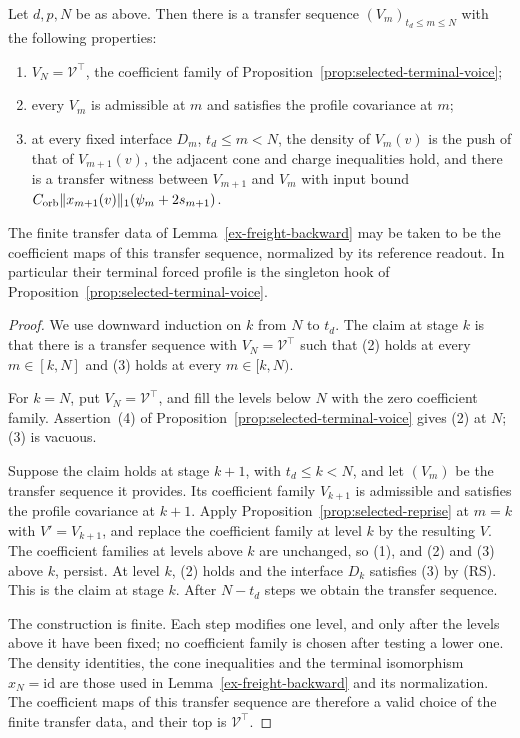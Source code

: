 \begin{proposition}
\label{prop:selected-music}
Let $d,p,N$ be as above. Then
there is a transfer sequence $(V_m)_{t_d\le m\le N}$ with the following properties:
\begin{enumerate}
\item $V_N=\mathcal V^\top$, the coefficient family of
  Proposition~\ref{prop:selected-terminal-voice};
\item every $V_m$ is admissible at $m$ and satisfies the profile covariance at
  $m$;
\item at every fixed interface $D_m$, $t_d\le m<N$, the density of $V_m(v)$
  is the push of that of $V_{m+1}(v)$, the adjacent cone and charge
  inequalities hold, and there is a transfer witness between $V_{m+1}$ and $V_m$
  with input bound $C_{\rm orb}\|x_{m+1}(v)\|_1(\psi_m+2s_{m+1})$.
\end{enumerate}
The finite transfer data of Lemma~\ref{ex-freight-backward} may be taken
to be the coefficient maps of this transfer sequence, normalized by its reference readout. In
particular their terminal forced profile is the singleton hook of
Proposition~\ref{prop:selected-terminal-voice}.
\end{proposition}

\begin{proof}
We use downward induction on $k$ from $N$ to $t_d$. The claim at stage
$k$ is that there is a transfer sequence with $V_N=\mathcal V^\top$ such that (2)
holds at every $m\in[k,N]$ and (3) holds at every $m\in[k,N)$.

For $k=N$, put $V_N=\mathcal V^\top$, and fill the levels below $N$
with the zero coefficient family. Assertion~(4) of
Proposition~\ref{prop:selected-terminal-voice} gives (2) at $N$; (3) is
vacuous.

Suppose the claim holds at stage $k+1$, with $t_d\le k<N$, and let
$(V_m)$ be the transfer sequence it provides. Its coefficient family $V_{k+1}$ is admissible and
satisfies the profile covariance at $k+1$. Apply
Proposition~\ref{prop:selected-reprise} at $m=k$ with
$V'=V_{k+1}$, and replace the coefficient family at level $k$ by the resulting $V$.
The coefficient families at levels above $k$ are unchanged, so (1), and (2) and (3)
above $k$, persist. At level $k$, (2) holds and the interface $D_k$
satisfies (3) by (RS). This is the claim at stage $k$. After $N-t_d$
steps we obtain the transfer sequence.

The construction is finite. Each step modifies one level, and only
after the levels above it have been fixed; no coefficient family is chosen after
testing a lower one. The density identities, the cone inequalities and
the terminal isomorphism $x_N=\mathrm{id}$ are those used in
Lemma~\ref{ex-freight-backward} and its normalization. The coefficient maps of
this transfer sequence are therefore a valid choice of the finite transfer data,
and their top is $\mathcal V^\top$.
\end{proof}

